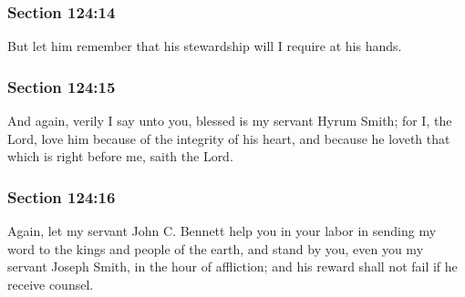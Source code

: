	\subsubsection{Section 124:14} %
		\label{DC124-14}

		But let him remember that his stewardship will I require at his hands.


	\subsubsection{Section 124:15} %
		\label{DC124-15}

		And again, verily I say unto you, blessed is my servant Hyrum Smith; for I, the Lord, love him because of the integrity of his heart, and because he loveth that which is right before me, saith the Lord.


	\subsubsection{Section 124:16} %
		\label{DC124-16}

		Again, let my servant John C. Bennett help you in your labor in sending my word to the kings and people of the earth, and stand by you, even you my servant Joseph Smith, in the hour of affliction; and his reward shall not fail if he receive counsel.


